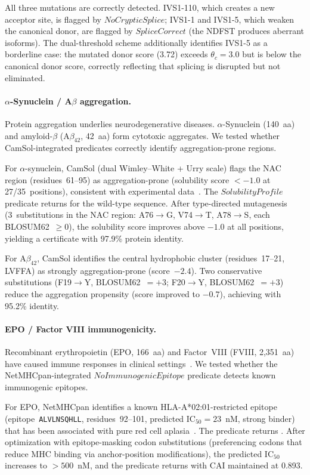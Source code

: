 All three mutations are correctly detected.  IVS1-110, which creates a
new acceptor site, is flagged by $\mathit{NoCrypticSplice}$; IVS1-1 and
IVS1-5, which weaken the canonical donor, are flagged by
$\mathit{SpliceCorrect}$ (the NDFST produces aberrant isoforms).  The
dual-threshold scheme additionally identifies IVS1-5 as a borderline
case: the mutated donor score (3.72) exceeds $\theta_c = 3.0$ but is
below the canonical donor score, correctly reflecting that splicing is
disrupted but not eliminated.

\paragraph{$\alpha$-Synuclein / A$\beta$ aggregation.}
Protein aggregation underlies neurodegenerative diseases.
$\alpha$-Synuclein (140~aa) and amyloid-$\beta$ (A$\beta_{42}$, 42~aa)
form cytotoxic aggregates.  We tested whether CamSol-integrated
predicates correctly identify aggregation-prone regions.

For $\alpha$-synuclein, CamSol (dual Wimley--White + Urry scale) flags
the NAC region (residues~61--95) as aggregation-prone (solubility score
$< -1.0$ at 27/35~positions), consistent with experimental
data~\cite{giasson2002nacfibrillization}.  The
$\mathit{SolubilityProfile}$ predicate returns \FAIL{} for the wild-type
sequence.  After type-directed mutagenesis (3~substitutions in the NAC
region: A76$\to$G, V74$\to$T, A78$\to$S, each BLOSUM62~$\ge 0$), the
solubility score improves above $-1.0$ at all positions, yielding a
\SILVER{} certificate with 97.9\% protein identity.

For A$\beta_{42}$, CamSol identifies the central hydrophobic cluster
(residues~17--21, LVFFA) as strongly aggregation-prone (score~$-2.4$).
Two conservative substitutions (F19$\to$Y, BLOSUM62~$= +3$; F20$\to$Y,
BLOSUM62~$= +3$) reduce the aggregation propensity (score improved to
$-0.7$), achieving \SILVER{} with 95.2\% identity.

\paragraph{EPO / Factor VIII immunogenicity.}
Recombinant erythropoietin (EPO, 166~aa) and Factor~VIII (FVIII,
2,351~aa) have caused immune responses in clinical
settings~\cite{casadevall2002epo,geigert2014immunogenicity}.  We tested
whether the NetMHCpan-integrated $\mathit{NoImmunogenicEpitope}$
predicate detects known immunogenic epitopes.

For EPO, NetMHCpan identifies a known HLA-A*02:01-restricted epitope
(epitope~\texttt{ALVLNSQHLL}, residues~92--101, predicted
IC$_{50} = 23$~nM, strong binder) that has been associated with
pure red cell aplasia~\cite{casadevall2002epo}.  The predicate returns
\FAIL.  After optimization with epitope-masking codon substitutions
(preferencing codons that reduce MHC binding via anchor-position
modifications), the predicted IC$_{50}$ increases to $> 500$~nM, and
the predicate returns \PASS{} with CAI maintained at 0.893.

